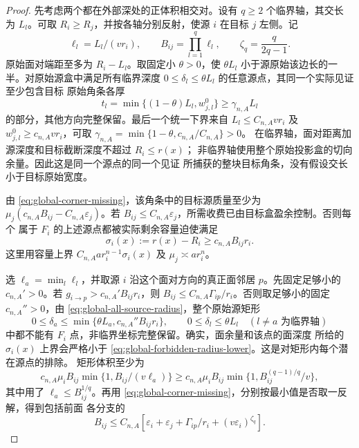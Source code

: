 \begin{proof}
先考虑两个都在外部深处的正体积相交对。设有 \(q\ge2\) 个临界轴，其交长
为 \(L_l\)。可取 \(R_i\ge R_j\)，并按各轴分别反射，使源 \(i\) 在目标
\(j\) 左侧。记
\[
 \ell_l=L_l/(vr_i),\qquad B_{ij}=\prod_{l=1}^q\ell_l,
 \qquad \zeta_q=\frac q{2q-1}.
\]
原始面对端距至多为 \(R_i-L_l\)。取固定小 \(\theta>0\)，使
\(\theta L_l\) 小于源原始该边长的一半。对原始源盒中满足所有临界深度
\(0\le\delta_l\le\theta L_l\) 的任意源点，其同一个实际见证至少包含目标
原始角条各厚
\begin{equation}\label{eq:global-forbidden-target-clip}
 t_l=\min\{(1-\theta)L_l,w_{j,l}^0\}
 \ge\gamma_{n,A}L_l
\end{equation}
的部分，其他方向完整保留。最后一个统一下界来自
\(L_l\le C_{n,A}vr_i\) 及 \(w_{j,l}^0\ge c_{n,A}vr_i\)，可取
\(\gamma_{n,A}=\min\{1-\theta,c_{n,A}/C_{n,A}\}>0\)。
在临界轴，面对距离加源深度和目标截断深度不超过 \(R_i\le r(x)\)；
非临界轴使用整个原始投影盒的切向余量。因此这是同一个源点的同一个见证
所捕获的整块目标角条，没有假设交长小于目标原始宽度。

由 \eqref{eq:global-corner-missing}，该角条中的目标源质量至少为
\(\mu_j(c_{n,A}B_{ij}-C_{n,A}\varepsilon_j)\)。若
\(B_{ij}\le C_{n,A}\varepsilon_j\)，所需收费已由目标盒盈余控制。否则每个
属于 \(F_i\) 的上述源点都被实际剩余容量迫使满足
\begin{equation}\label{eq:global-forbidden-radius-lower}
 \sigma_i(x):=r(x)-R_i\ge c_{n,A}B_{ij}r_i.
\end{equation}
这里用容量上界 \(C_{n,A}ar_i^{n-1}\sigma_i(x)\) 及
\(\mu_j\asymp ar_i^n\)。

选 \(\ell_a=\min_l\ell_l\)，并取源 \(i\) 沿这个面对方向的真正面邻居
\(p\)。先固定足够小的 \(c_{n,A}'>0\)。若
\(g_{i\to p}>c_{n,A}'B_{ij}r_i\)，则
\(B_{ij}\le C_{n,A}\Gamma_{ip}/r_i\)。否则取足够小的固定
\(c_{n,A}''>0\)，由 \eqref{eq:global-all-source-radius}，整个原始源矩形
\begin{equation}\label{eq:global-forbidden-source-box}
 0\le\delta_a\le\min\{\theta L_a,c_{n,A}''B_{ij}r_i\},\qquad
 0\le\delta_l\le\theta L_l\quad(l\ne a\text{ 为临界轴})
\end{equation}
中都不能有 \(F_i\) 点，非临界坐标完整保留。确实，面余量和该点的面深度
所给的 \(\sigma_i(x)\) 上界会严格小于
\eqref{eq:global-forbidden-radius-lower}。这是对矩形内每个潜在源点的排除。
矩形体积至少为
\[
 c_{n,A}\mu_i B_{ij}\min\{1,B_{ij}/(v\ell_a)\}
 \ge c_{n,A}\mu_i B_{ij}\min\{1,B_{ij}^{(q-1)/q}/v\},
\]
其中用了 \(\ell_a\le B_{ij}^{1/q}\)。再用
\eqref{eq:global-corner-missing}，分别按最小值是否取一反解，得到包括前面
各分支的
\begin{equation}\label{eq:global-all-source-corner-bound}
 B_{ij}\le C_{n,A}\left[\varepsilon_i+\varepsilon_j+
           \Gamma_{ip}/r_i+(v\varepsilon_i)^{\zeta_q}\right].
\end{equation}


\end{proof}
